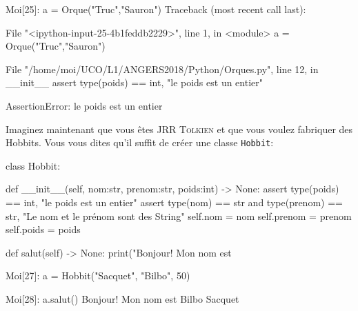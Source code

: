 \documentclass[french]{beamer}
\begin{document}
  \begin{frame}[fragile]
    \begin{pythoncode}
Moi[25]: a = Orque("Truc","Sauron")
Traceback (most recent call last):

  File "<ipython-input-25-4b1feddb2229>", line 1, in <module>
    a = Orque("Truc","Sauron")

  File "/home/moi/UCO/L1/ANGERS2018/Python/Orques.py", line 12, in __init__
    assert type(poids) == int, "le poids est un entier"

AssertionError: le poids est un entier
\end{pythoncode}
  \end{frame}




  \begin{frame}
    
Imaginez maintenant  que vous  êtes JRR  \textsc{Tolkien} et  que vous
voulez fabriquer  des Hobbits. Vous  vous dites qu'il suffit  de créer
une classe \texttt{Hobbit}:

\pause

\begin{center}
\end{center}
  \end{frame}


  \begin{frame}[fragile]
    \begin{pythoncode}
class Hobbit:

    def __init__(self, nom:str, prenom:str, poids:int) -> None:
        assert type(poids) == int, "le poids est un entier"
        assert type(nom) == str and type(prenom) == str, "Le nom et le prénom sont des String"
        self.nom    = nom
        self.prenom = prenom
        self.poids  = poids

    def salut(self) -> None:
        print("Bonjour! Mon nom est %
\end{pythoncode}


    
  \end{frame}

  \begin{frame}[fragile]
    \begin{pythoncode}
Moi[27]: a = Hobbit("Sacquet", "Bilbo", 50)

Moi[28]: a.salut()
Bonjour! Mon nom est Bilbo Sacquet
\end{pythoncode}


  \end{frame}
\end{document}
